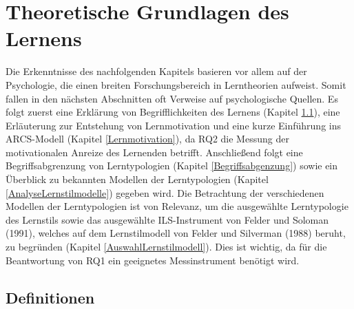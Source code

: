 \chapter{Theoretische Grundlagen des Lernens}
Die Erkenntnisse des nachfolgenden Kapitels basieren vor allem 
auf der Psychologie, die einen breiten Forschungsbereich 
in Lerntheorien aufweist. Somit fallen in den nächsten Abschnitten 
oft Verweise auf psychologische Quellen.
Es folgt zuerst eine Erklärung von Begrifflichkeiten des Lernens (Kapitel \ref{BegriffLernen}),
eine Erläuterung zur Entstehung von Lernmotivation und eine kurze 
Einführung ins ARCS-Modell (Kapitel \ref{Lernmotivation}), da RQ2 
die Messung der motivationalen Anreize des 
Lernenden betrifft.
Anschließend folgt eine Begriffsabgrenzung von Lerntypologien (Kapitel \ref{Begriffsabgenzung}) sowie ein 
Überblick zu bekannten Modellen der Lerntypologien (Kapitel \ref{AnalyseLernstilmodelle}) gegeben wird.
Die Betrachtung der verschiedenen Modellen der Lerntypologien ist von Relevanz, um die ausgewählte Lerntypologie des Lernstils sowie  das ausgewählte
ILS-Instrument von Felder und Soloman (1991), welches auf dem Lernstilmodell von Felder und Silverman (1988) beruht, 
zu begründen (Kapitel \ref{AuswahlLernstilmodell}).
Dies ist wichtig, da für 
die Beantwortung von RQ1 ein geeignetes Messinstrument benötigt wird. 
    \section{Definitionen} \label{BegriffLernen}
